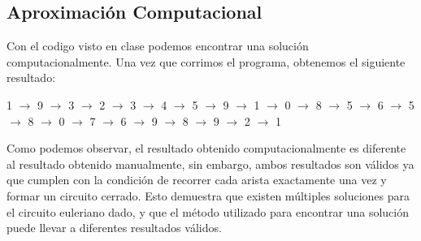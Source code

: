 \subsection{Aproximación Computacional}

Con el codigo visto en clase podemos encontrar una solución computacionalmente.
Una vez que corrimos el programa, obtenemos el siguiente resultado:
\begin{center}
1 $\rightarrow$
9 $\rightarrow$
3 $\rightarrow$
2 $\rightarrow$
3 $\rightarrow$
4 $\rightarrow$
5 $\rightarrow$
9 $\rightarrow$
1 $\rightarrow$
0 $\rightarrow$
8 $\rightarrow$
5 $\rightarrow$
6 $\rightarrow$
5 $\rightarrow$
8 $\rightarrow$
0 $\rightarrow$
7 $\rightarrow$
6 $\rightarrow$
9 $\rightarrow$
8 $\rightarrow$
9 $\rightarrow$
2 $\rightarrow$
1
\end{center}

Como podemos observar, el resultado obtenido computacionalmente es diferente al resultado obtenido 
manualmente, sin embargo, ambos resultados son válidos ya que cumplen con la condición de 
recorrer cada arista exactamente una vez y formar un circuito cerrado. 
Esto demuestra que existen múltiples soluciones para el circuito euleriano dado, y que el 
método utilizado para encontrar una solución puede llevar a diferentes resultados válidos.